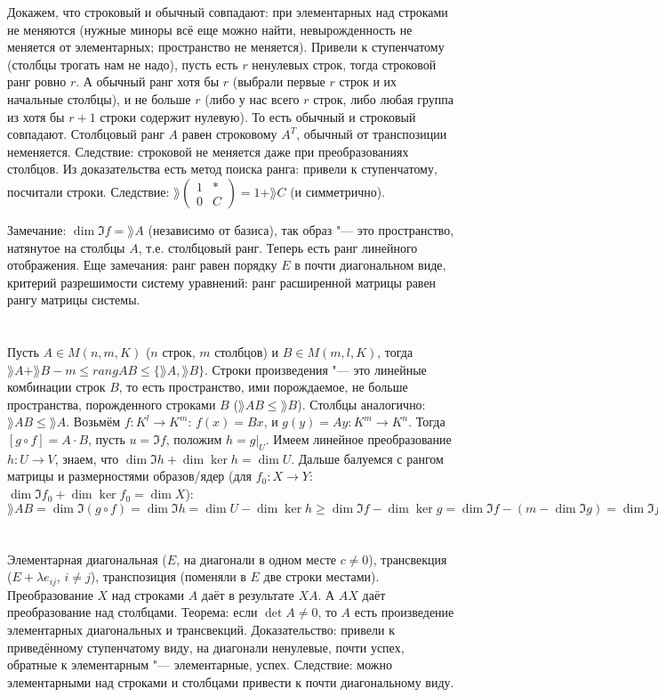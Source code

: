 Докажем, что строковый и обычный совпадают: при элементарных над строками не меняются (нужные миноры всё еще можно найти, невырожденность не меняется от элементарных; пространство не меняется).
Привели к ступенчатому (столбцы трогать нам не надо), пусть есть $r$ ненулевых строк, тогда строковой ранг ровно $r$.
А обычный ранг хотя бы $r$ (выбрали первые $r$ строк и их начальные столбцы), и не больше $r$ (либо у нас всего $r$ строк, либо любая группа из хотя бы $r+1$ строки содержит нулевую).
То есть обычный и строковый совпадают.
Столбцовый ранг $A$ равен строковому $A^T$, обычный от транспозиции неменяется.
Следствие: строковой не меняется даже при преобразованиях столбцов.
Из доказательства есть метод поиска ранга: привели к ступенчатому, посчитали строки.
Следствие: $\rang \begin{pmatrix}1&*\\0&C\end{pmatrix} = 1 + \rang C$ (и симметрично).

Замечание: $\dim \Im f = \rang A$ (независимо от базиса), так образ "--- это пространство, натянутое на столбцы $A$, т.е. столбцовый ранг.
Теперь есть ранг линейного отображения.
Еще замечания: ранг равен порядку $E$ в почти диагональном виде, критерий разрешимости систему уравнений: ранг расширенной матрицы равен рангу матрицы системы.

\section{} %
Пусть $A \in M(n, m, K)$ ($n$ строк, $m$ столбцов) и $B \in M(m, l, K)$, тогда
$\rang A + \rang B - m \le rang AB \le \{ \rang A, \rang B \}$.
Строки произведения "--- это линейные комбинации строк $B$, то есть пространство, ими порождаемое, не больше пространства, порожденного строками $B$ ($\rang AB \le \rang B$).
Столбцы аналогично: $\rang AB \le \rang A$.
Возьмём $f\colon K^l \to K^m$: $f(x)=Bx$, и $g(y)=Ay \colon K^m \to K^n$.
Тогда $[g \circ f] = A \cdot B$, пусть $u = \Im f$, положим $h = g|_U$.
Имеем линейное преобразование $h \colon U \to V$, знаем, что $\dim \Im h + \dim \ker h = \dim U$.
Дальше балуемся с рангом матрицы и размерностями образов/ядер (для $f_0 \colon X \to Y$: $\dim \Im f_0 + \dim \ker f_0 = \dim X$):
$\rang AB
= \dim \Im (g \circ f)
= \dim \Im h
= \dim U - \dim \ker h
\ge \dim \Im f - \dim \ker g
= \dim \Im f - (m - \dim \Im g)
= \dim \Im f + \dim \Im g - m
= \rang A + \rang B - m
$

\section{} %
Элементарная диагональная ($E$, на диагонали в одном месте $c \neq 0$),
трансвекция ($E+\lambda e_{ij}$, $i \neq j$),
транспозиция (поменяли в $E$ две строки местами).
Преобразование $X$ над строками $A$ даёт в результате $XA$.
А $AX$ даёт преобразование над столбцами.
Теорема: если $\det A \neq 0$, то $A$ есть произведение элементарных диагональных и трансвекций.
Доказательство: привели к приведённому ступенчатому виду, на диагонали ненулевые, почти успех, обратные к элементарным "--- элементарные, успех.
Следствие: можно элементарными над строками и столбцами привести к почти диагональному виду.

